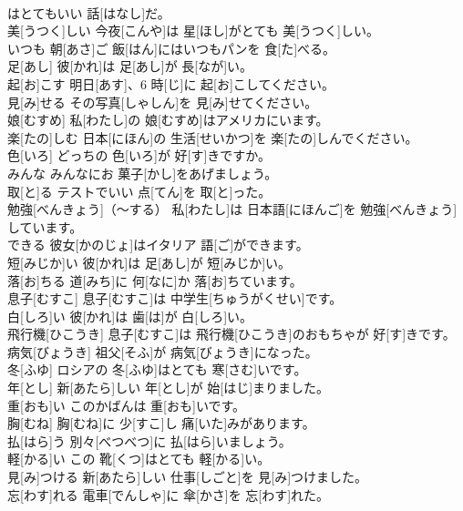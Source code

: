 \documentclass[8pt]{extreport}
\begin{document}
\begin{CJK}{UTF8}{min}
\\	はとてもいい 話[はなし]だ。		
\\	美[うつく]しい	今夜[こんや]は 星[ほし]がとても 美[うつく]しい。		
\\	いつも	朝[あさ]ご 飯[はん]にはいつもパンを 食[た]べる。		
\\	足[あし]	彼[かれ]は 足[あし]が 長[なが]い。		
\\	起[お]こす	明日[あす]、6 時[じ]に 起[お]こしてください。		
\\	見[み]せる	その写真[しゃしん]を 見[み]せてください。		
\\	娘[むすめ]	私[わたし]の 娘[むすめ]はアメリカにいます。		
\\	楽[たの]しむ	日本[にほん]の 生活[せいかつ]を 楽[たの]しんでください。		
\\	色[いろ]	どっちの 色[いろ]が 好[す]きですか。		
\\	みんな	みんなにお 菓子[かし]をあげましょう。		
\\	取[と]る	テストでいい 点[てん]を 取[と]った。		
\\	勉強[べんきょう]（～する）	私[わたし]は 日本語[にほんご]を 勉強[べんきょう]しています。		
\\	できる	彼女[かのじょ]はイタリア 語[ご]ができます。		
\\	短[みじか]い	彼[かれ]は 足[あし]が 短[みじか]い。		
\\	落[お]ちる	道[みち]に 何[なに]か 落[お]ちています。		
\\	息子[むすこ]	息子[むすこ]は 中学生[ちゅうがくせい]です。		
\\	白[しろ]い	彼[かれ]は 歯[は]が 白[しろ]い。		
\\	飛行機[ひこうき]	息子[むすこ]は 飛行機[ひこうき]のおもちゃが 好[す]きです。		
\\	病気[びょうき]	祖父[そふ]が 病気[びょうき]になった。		
\\	冬[ふゆ]	ロシアの 冬[ふゆ]はとても 寒[さむ]いです。		
\\	年[とし]	新[あたら]しい 年[とし]が 始[はじ]まりました。		
\\	重[おも]い	このかばんは 重[おも]いです。		
\\	胸[むね]	胸[むね]に 少[すこ]し 痛[いた]みがあります。		
\\	払[はら]う	別々[べつべつ]に 払[はら]いましょう。		
\\	軽[かる]い	この 靴[くつ]はとても 軽[かる]い。		
\\	見[み]つける	新[あたら]しい 仕事[しごと]を 見[み]つけました。		
\\	忘[わす]れる	電車[でんしゃ]に 傘[かさ]を 忘[わす]れた。		

\end{CJK}
\end{document}
